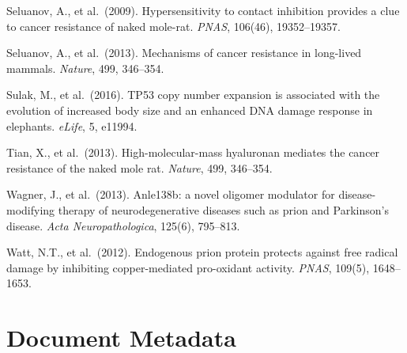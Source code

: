\documentclass[12pt,a4paper]{article}
\begin{document}
\begin{enumerate}[label={[\arabic*]}, leftmargin=2.5em, itemsep=0.3em]
  \item Seluanov, A., et al.\ (2009). Hypersensitivity to contact inhibition
    provides a clue to cancer resistance of naked mole-rat. \textit{PNAS},
    106(46), 19352--19357.

  \item Seluanov, A., et al.\ (2013). Mechanisms of cancer resistance in
    long-lived mammals. \textit{Nature}, 499, 346--354.

  \item Sulak, M., et al.\ (2016). TP53 copy number expansion is associated
    with the evolution of increased body size and an enhanced DNA damage
    response in elephants. \textit{eLife}, 5, e11994.

  \item Tian, X., et al.\ (2013). High-molecular-mass hyaluronan mediates
    the cancer resistance of the naked mole rat. \textit{Nature}, 499,
    346--354.

  \item Wagner, J., et al.\ (2013). Anle138b: a novel oligomer modulator
    for disease-modifying therapy of neurodegenerative diseases such as
    prion and Parkinson's disease. \textit{Acta Neuropathologica}, 125(6),
    795--813.

  \item Watt, N.T., et al.\ (2012). Endogenous prion protein protects
    against free radical damage by inhibiting copper-mediated pro-oxidant
    activity. \textit{PNAS}, 109(5), 1648--1653.

\end{enumerate}

\section*{Document Metadata}
\end{document}
